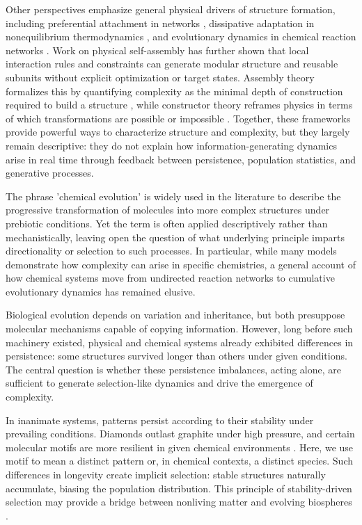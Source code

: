 \documentclass{artificial-life}
\let\cite\citep
\begin{document}
Other perspectives emphasize general physical drivers of structure formation, including preferential attachment in networks \cite{barabasi1999emergence}, dissipative adaptation in nonequilibrium thermodynamics \cite{prigogine1977self, england2015dissipative}, and evolutionary dynamics in chemical reaction networks \cite{wu2009origin, nowak2006evolutionary}. Work on physical self-assembly has further shown that local interaction rules and constraints can generate modular structure and reusable subunits without explicit optimization or target states. Assembly theory formalizes this by quantifying complexity as the minimal depth of construction required to build a structure \cite{sharma2023assembly}, while constructor theory reframes physics in terms of which transformations are possible or impossible \cite{deutsch2013constructor}. Together, these frameworks provide powerful ways to characterize structure and complexity, but they largely remain descriptive: they do not explain how information-generating dynamics arise in real time through feedback between persistence, population statistics, and generative processes.

The phrase 'chemical evolution' is widely used in the literature to describe the progressive transformation of molecules into more complex structures under prebiotic conditions. Yet the term is often applied descriptively rather than mechanistically, leaving open the question of what underlying principle imparts directionality or selection to such processes. In particular, while many models demonstrate how complexity can arise in specific chemistries, a general account of how chemical systems move from undirected reaction networks to cumulative evolutionary dynamics has remained elusive.

Biological evolution depends on variation and inheritance, but both presuppose molecular mechanisms capable of copying information. However, long before such machinery existed, physical and chemical systems already exhibited differences in persistence: some structures survived longer than others under given conditions. The central question is whether these persistence imbalances, acting alone, are sufficient to generate selection-like dynamics and drive the emergence of complexity.

In inanimate systems, patterns persist according to their stability under prevailing conditions. Diamonds outlast graphite under high pressure, and certain molecular motifs are more resilient in given chemical environments \cite{ruizmirazo2014}. Here, we use motif to mean a distinct pattern or, in chemical contexts, a distinct species. Such differences in longevity create implicit selection: stable structures naturally accumulate, biasing the population distribution. This principle of stability-driven selection may provide a bridge between nonliving matter and evolving biospheres \cite{kauffman1993origins, hordijk2012autocatalytic, nghe2015prebiotic}.
\end{document}
